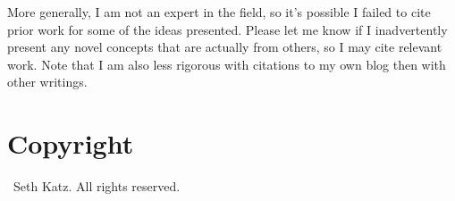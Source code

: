 \documentclass{article}
\begin{document}
 More generally, I am not an expert in the field, so it's possible I failed to cite prior work for some of the ideas presented.   Please let me know if I inadvertently present any novel concepts that are actually from others, so I may cite relevant work.  Note that I am also less rigorous with citations to my own blog then with other writings.

\section{Copyright}
\small
\textcopyright\ Seth Katz. All rights reserved.

 
  
  
\end{document}
